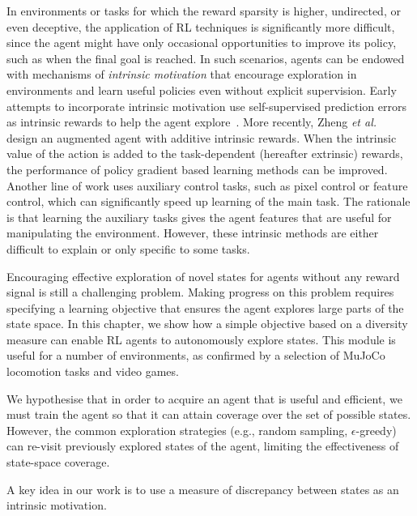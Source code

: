 In environments or tasks for which the reward sparsity is higher, undirected, or even deceptive, the application of RL techniques is significantly more difficult, since the agent might have only occasional opportunities to improve its policy, such as when the final goal is reached. In such scenarios, agents can be endowed with mechanisms of {\it intrinsic motivation} that encourage exploration in environments and learn useful policies even without explicit supervision. Early attempts to incorporate intrinsic motivation use self-supervised prediction errors as intrinsic rewards to help the agent explore~\cite{pathak2017curiosity}. More recently, Zheng \textit{et al.}~\cite{zheng2018learning} design an augmented agent with additive intrinsic rewards. When the intrinsic value of the action is added to the task-dependent (hereafter extrinsic) rewards, the performance of policy gradient based learning methods can be improved. Another line of work uses auxiliary control tasks, such as pixel control or feature control, which can significantly speed up learning of the main task. The rationale is that learning the auxiliary tasks gives the agent features that are useful for manipulating the environment. However, these intrinsic methods are either difficult to explain or only specific to some tasks.

Encouraging effective exploration of novel states for agents without any reward signal is still a challenging problem.
Making progress on this problem requires specifying a learning objective that ensures the agent explores large parts of the state space. In this chapter, we show how a simple objective based on a diversity measure can enable RL agents to autonomously explore states. This module is useful for a number of environments, as confirmed by a selection of MuJoCo locomotion tasks and video games.

We hypothesise that in order to acquire an agent that is useful and efficient, we must train the agent so that it can attain coverage over the set of possible states. However, the common exploration strategies ({e.g.}, random sampling, $\epsilon$-greedy) can re-visit previously explored states of the agent, limiting the effectiveness of state-space coverage.

A key idea in our work is to use a measure of discrepancy between states as an intrinsic motivation. 

